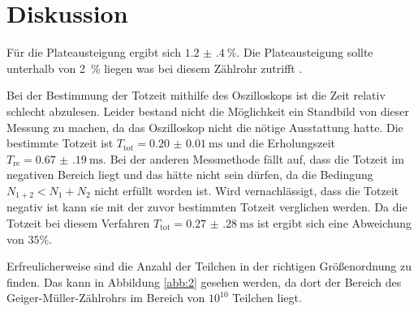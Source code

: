 \section{Diskussion}
Für die Plateausteigung ergibt sich $\SI{1.2(4)}{\%}$. Die Plateausteigung sollte
unterhalb von \SI{2}{\%} liegen was bei diesem Zählrohr zutrifft \cite{2}.

Bei der Bestimmung der Totzeit mithilfe des Oszilloskops ist die Zeit relativ schlecht abzulesen.
Leider bestand nicht die Möglichkeit ein Standbild von dieser Messung zu machen, da das Oszilloskop nicht die nötige
Ausstattung hatte. Die bestimmte Totzeit ist $T_\text{tot} = \SI{0.20(1)}{\milli\second}$
und die Erholungszeit $T_\text{re} = \SI{0.67(19)}{\milli\second}$.
Bei der anderen Messmethode fällt auf, dass die Totzeit im negativen Bereich liegt und das hätte nicht sein dürfen,
da die Bedingung $N_{1+2} < N_1 + N_2$ nicht erfüllt worden ist. Wird vernachlässigt, dass
die Totzeit negativ ist kann sie mit der zuvor bestimmten Totzeit verglichen werden. Da die
Totzeit bei diesem Verfahren $T_\text{tot} = \SI{0.27(28)}{\milli\second}$ ist ergibt sich eine
Abweichung von $35 \%$.

Erfreulicherweise sind die Anzahl der Teilchen in der richtigen Größenordnung zu finden. Das
kann in Abbildung \ref{abb:2} gesehen werden, da dort der Bereich des Geiger-Müller-Zählrohrs
im Bereich von $10^{10}$ Teilchen liegt.
